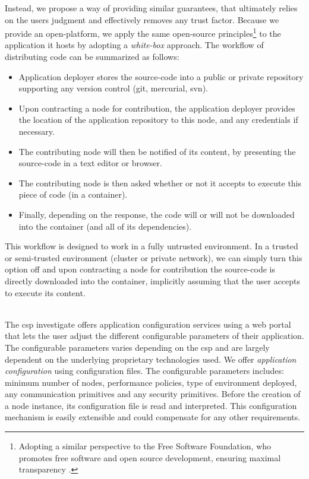 \documentclass[12pt, titlepage]{uo_temp}
\begin{document}
     Instead, we propose a way of providing similar guarantees, that ultimately relies on
     the users judgment and effectively removes any trust factor. Because we provide an
     open-platform, we apply the same open-source principles\footnote{Adopting a similar
       perspective to the Free Software Foundation, who promotes free software and open
       source development, ensuring maximal transparency \cite{fsf}.} to the application it
     hosts by adopting a \emph{white-box} approach. The workflow of distributing code can
     be summarized as follows:
     \begin{itemize}
       \item Application deployer stores the source-code into a public or private
         repository supporting any version control (git, mercurial, svn).
       \item Upon contracting a node for contribution, the application deployer provides
         the location of the application repository to this node, and any credentials if necessary.
       \item The contributing node will then be notified of its content, by presenting the
         source-code in a text editor or browser.
       \item The contributing node is then asked whether or not it accepts to execute this
         piece of code (in a container).
       \item Finally, depending on the response, the code will or will not be downloaded
         into the container (and all of its dependencies).
     \end{itemize}
     This workflow is designed to work in a fully untrusted environment. In a trusted or
     semi-trusted environment (cluster or private network), we can simply turn this option
     off and upon contracting a node for contribution the source-code is directly
     downloaded into the container, implicitly assuming that the user accepts to execute
     its content.

     \\ The \gls{csp} investigate offers application configuration services using a web
     portal that lets the user adjust the different configurable parameters of their
     application. The configurable parameters varies depending on the \gls{csp} and are
     largely dependent on the underlying proprietary technologies used. We offer
     \emph{application configuration} using configuration files. The configurable
     parameters includes: minimum number of nodes, performance policies, type of
     environment deployed, any communication primitives and any security
     primitives. Before the creation of a node instance, its configuration file is read
     and interpreted. This configuration mechanism is easily extensible and could
     compensate for any other requirements.
\end{document}
